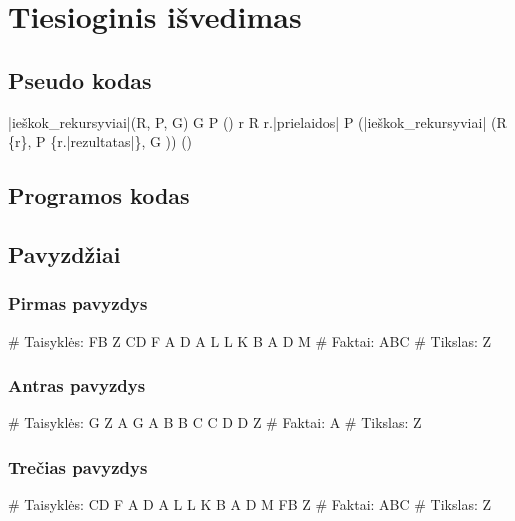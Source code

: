 \chapter{Tiesioginis išvedimas}

\section{Pseudo kodas}

\begin{program}
  \FUNCT |ieškok_rekursyviai|(R, P, G) \BODY
    \IF G \in P \THEN \EXIT(\true) \FI
    \FOREACH r \in R \DO
      \IF r.|prielaidos| \subseteq P
      \THEN \EXIT(|ieškok_rekursyviai|%
        (R \setminus \{r\}, P \cup \{r.|rezultatas|\}, G ))
      \FI
    \OD
    \EXIT(\false)%
  \ENDFUNCT
\end{program}

\section{Programos kodas}


\section{Pavyzdžiai}

\subsection{Pirmas pavyzdys}

\begin{pythonaienv}[fc]
# Taisyklės:
FB Z
CD F
A D
A L
L K
B A
D M
# Faktai:
ABC
# Tikslas:
Z
\end{pythonaienv}

\subsection{Antras pavyzdys}

\begin{pythonaienv}[fc]
# Taisyklės:
G Z
A G
A B
B C
C D
D Z
# Faktai:
A
# Tikslas:
Z
\end{pythonaienv}

\subsection{Trečias pavyzdys}

\begin{pythonaienv}[fc]
# Taisyklės:
CD F
A D
A L
L K
B A
D M
FB Z
# Faktai:
ABC
# Tikslas:
Z
\end{pythonaienv}
